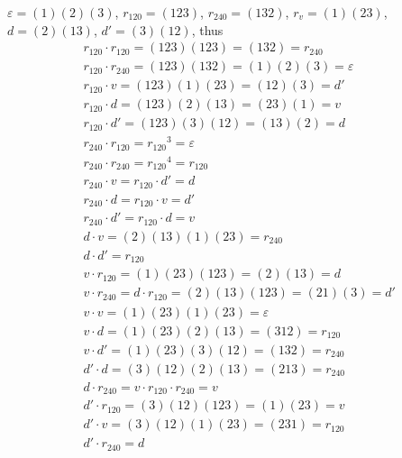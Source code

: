 \documentclass[11pt]{homework}
\begin{document}
\question
\begin{alphaparts}
    \questionpart $\varepsilon = (1)(2)(3)$, $r_{120}=(123)$, $r_{240}=(132)$, $r_v=(1)(23)$, $d=(2)(13)$, $d'=(3)(12)$, thus
    \begin{align*}
         & r_{120}\cdot r_{120}=(123)(123)=(132)=r_{240}         \\
         & r_{120}\cdot r_{240}=(123)(132)=(1)(2)(3)=\varepsilon \\
         & r_{120}\cdot v=(123)(1)(23)=(12)(3)=d'                \\
         & r_{120}\cdot d=(123)(2)(13)=(23)(1)=v                 \\
         & r_{120}\cdot d'=(123)(3)(12)=(13)(2)=d                \\
         & r_{240}\cdot r_{120}={r_{120}}^3=\varepsilon          \\
         & r_{240}\cdot r_{240}={r_{120}}^4=r_{120}              \\
         & r_{240}\cdot v=r_{120}\cdot d'=d                      \\
         & r_{240}\cdot d=r_{120}\cdot v=d'                      \\
         & r_{240}\cdot d'=r_{120}\cdot d=v                      \\
         & d\cdot v=(2)(13)(1)(23)=r_{240}                       \\
         & d\cdot d'=r_{120}                                     \\
         & v\cdot r_{120}=(1)(23)(123)=(2)(13)=d                 \\
         & v\cdot r_{240}=d\cdot r_{120}=(2)(13)(123)=(21)(3)=d' \\
         & v\cdot v=(1)(23)(1)(23)=\varepsilon                   \\
         & v\cdot d=(1)(23)(2)(13)=(312)=r_{120}                 \\
         & v\cdot d'=(1)(23)(3)(12)=(132)=r_{240}                \\
         & d'\cdot d=(3)(12)(2)(13)=(213)=r_{240}                \\
         & d\cdot r_{240}=v\cdot r_{120} \cdot r_{240}=v         \\
         & d'\cdot r_{120}=(3)(12)(123)=(1)(23)=v                \\
         & d'\cdot v=(3)(12)(1)(23)=(231)=r_{120}                \\
         & d'\cdot r_{240}=d                                     \\

\end{align*}
\end{alphaparts}
\end{document}
